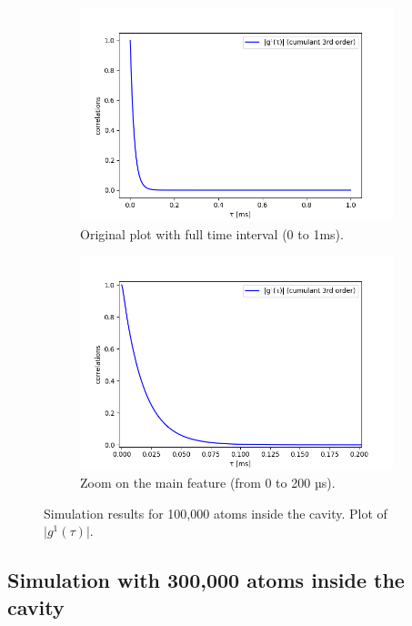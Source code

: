 \documentclass[11pt]{report}
\begin{document}
\begin{figure}[h!]
\centering
\begin{subfigure}{.48\textwidth}
  \centering
  \includegraphics[width=1\linewidth]{100k_3_g1}
  \caption{Original plot with full time interval (0 to 1ms).}
\end{subfigure}%
\hspace{1em}%
\begin{subfigure}{.48\textwidth}
  \centering
  \includegraphics[width=1\linewidth]{100k_3_g1_zoom_1}
  \caption{Zoom on the main feature (from 0 to 200 µs).}
  \label{100k_3_g1_zoom_1}
\end{subfigure}
\caption{Simulation results for 100,000 atoms inside the cavity. Plot of $\vert g^1(\tau) \vert$.}
\end{figure}

\pagebreak
\subsection{Simulation with 300,000 atoms inside the cavity}
\end{document}
